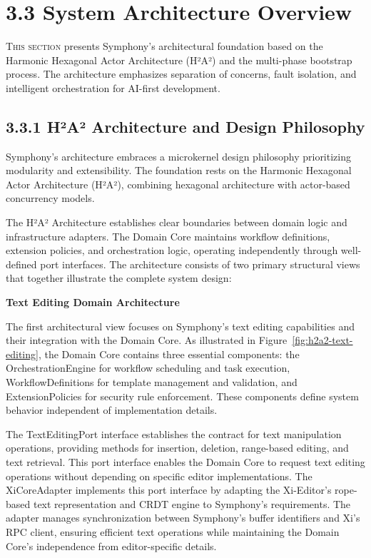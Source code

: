 
\section{3.3 System Architecture Overview}
\label{sec:architecture-overview}

\lettrine{T}{his section} presents Symphony's architectural foundation based on the Harmonic Hexagonal Actor Architecture (H²A²) and the multi-phase bootstrap process. The architecture emphasizes separation of concerns, fault isolation, and intelligent orchestration for AI-first development.

\subsection*{3.3.1 H²A² Architecture and Design Philosophy}

Symphony's architecture embraces a microkernel design philosophy prioritizing modularity and extensibility. The foundation rests on the Harmonic Hexagonal Actor Architecture (H²A²), combining hexagonal architecture with actor-based concurrency models.

The H²A² Architecture establishes clear boundaries between domain logic and infrastructure adapters. The Domain Core maintains workflow definitions, extension policies, and orchestration logic, operating independently through well-defined port interfaces. The architecture consists of two primary structural views that together illustrate the complete system design:

\textbf{Text Editing Domain Architecture}

The first architectural view focuses on Symphony's text editing capabilities and their integration with the Domain Core. As illustrated in Figure~\ref{fig:h2a2-text-editing}, the Domain Core contains three essential components: the OrchestrationEngine for workflow scheduling and task execution, WorkflowDefinitions for template management and validation, and ExtensionPolicies for security rule enforcement. These components define system behavior independent of implementation details.

The TextEditingPort interface establishes the contract for text manipulation operations, providing methods for insertion, deletion, range-based editing, and text retrieval. This port interface enables the Domain Core to request text editing operations without depending on specific editor implementations. The XiCoreAdapter implements this port interface by adapting the Xi-Editor's rope-based text representation and CRDT engine to Symphony's requirements. The adapter manages synchronization between Symphony's buffer identifiers and Xi's RPC client, ensuring efficient text operations while maintaining the Domain Core's independence from editor-specific details.

